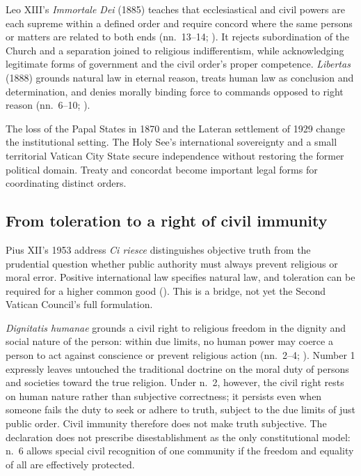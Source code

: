 Leo XIII's \emph{Immortale Dei} (1885) teaches that ecclesiastical and civil powers are each supreme within a defined order and require concord where the same persons or matters are related to both ends (nn.~13--14; ). It rejects subordination of the Church and a separation joined to religious indifferentism, while acknowledging legitimate forms of government and the civil order's proper competence. \emph{Libertas} (1888) grounds natural law in eternal reason, treats human law as conclusion and determination, and denies morally binding force to commands opposed to right reason (nn.~6--10; ).

The loss of the Papal States in 1870 and the Lateran settlement of 1929 change the institutional setting. The Holy See's international sovereignty and a small territorial Vatican City State secure independence without restoring the former political domain. Treaty and concordat become important legal forms for coordinating distinct orders.

\subsection{From toleration to a right of civil immunity}

Pius XII's 1953 address \emph{Ci riesce} distinguishes objective truth from the prudential question whether public authority must always prevent religious or moral error. Positive international law specifies natural law, and toleration can be required for a higher common good (). This is a bridge, not yet the Second Vatican Council's full formulation.

\emph{Dignitatis humanae} grounds a civil right to religious freedom in the dignity and social nature of the person: within due limits, no human power may coerce a person to act against conscience or prevent religious action (nn.~2--4; ). Number 1 expressly leaves untouched the traditional doctrine on the moral duty of persons and societies toward the true religion. Under n.~2, however, the civil right rests on human nature rather than subjective correctness; it persists even when someone fails the duty to seek or adhere to truth, subject to the due limits of just public order. Civil immunity therefore does not make truth subjective. The declaration does not prescribe disestablishment as the only constitutional model: n.~6 allows special civil recognition of one community if the freedom and equality of all are effectively protected.

